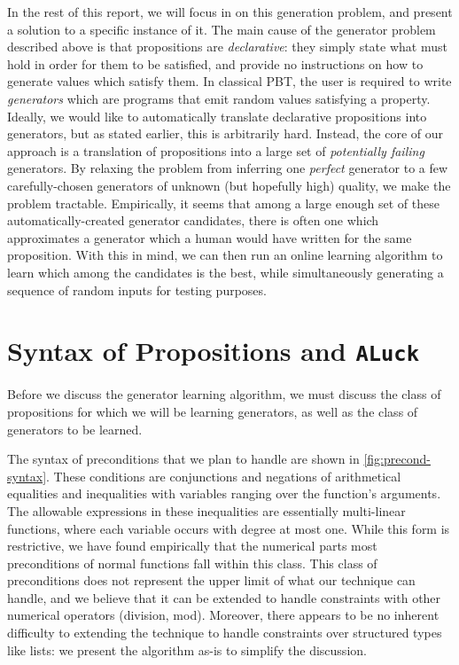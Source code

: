 \documentclass[sigconf,nonacm]{acmart}
\begin{document}
In the rest of this report, we will focus in on this generation problem, and
present a solution to a specific instance of it. The main cause of the generator
problem described above is that propositions are \textit{declarative}: they
simply state what must hold in order for them to be satisfied, and provide no
instructions on how to generate values which satisfy them. In classical PBT, the
user is required to write \textit{generators} which are programs that emit
random values satisfying a property. Ideally, we would like to automatically
translate declarative propositions into generators, but as stated earlier, this
is arbitrarily hard. Instead, the core of our approach is a translation of
propositions into a large set of \textit{potentially failing} generators. By
relaxing the problem from inferring one \textit{perfect} generator to a few
carefully-chosen generators of unknown (but hopefully high) quality, we make the
problem tractable. Empirically, it seems that among a large enough set of these
automatically-created generator candidates, there is often one which
approximates a generator which a human would have written for the same
proposition. With this in mind, we can then run an online learning algorithm to
learn which among the candidates is the best, while simultaneously generating a
sequence of random inputs for testing purposes.

\section{Syntax of Propositions and \texttt{ALuck}}
\label{sec:luck}

Before we discuss the generator learning algorithm, we must discuss the class of
propositions for which we will be learning generators, as well as the class of
generators to be learned.

The syntax of preconditions that we plan to handle are shown in
\autoref{fig:precond-syntax}. These conditions are conjunctions and negations of
arithmetical equalities and inequalities with variables ranging over the
function's arguments. The allowable expressions in these inequalities are
essentially multi-linear functions, where each variable occurs with degree at
most one. While this form is restrictive, we have found empirically that the
numerical parts most preconditions of normal functions fall within this class.
This class of preconditions does not represent the upper limit of what our
technique can handle, and we believe that it can be extended to handle
constraints with other numerical operators (division, mod). Moreover, there
appears to be no inherent difficulty to extending the technique to handle
constraints over structured types like lists: we present the algorithm as-is to
simplify the discussion.
\end{document}
